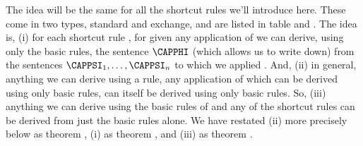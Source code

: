 The idea will be the same for all the shortcut rules we'll introduce here. These come in two types, standard and exchange, and are listed in table  and . The idea is, (i) for each shortcut rule , for given any application of  we can derive, using only the basic rules, the sentence $\CAPPHI$ (which  allows us to write down) from the sentences $\CAPPSI_1,\ldots,\CAPPSI_{\integer{n}}$ to which we applied . 
And, (ii) in general, anything we can derive using a rule, any application of which can be derived using only basic rules, can itself be derived using only basic rules.  
So, (iii) anything we can derive using the basic rules of \GSD{} and any of the shortcut rules can be derived from just the basic rules alone.
We have restated (ii) more precisely below as theorem , (i) as theorem , and (iii) as theorem . 

